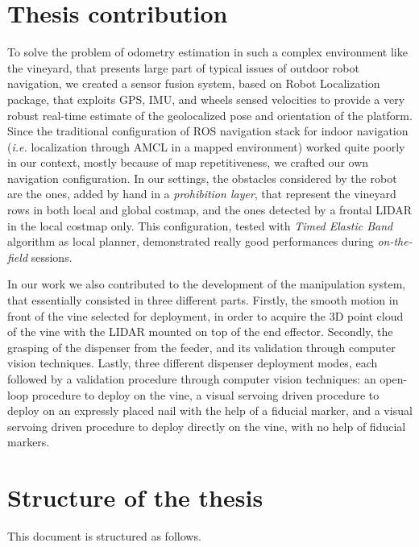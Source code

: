 \section{Thesis contribution}
To solve the problem of odometry estimation in such a complex environment like the vineyard, that presents large part of typical issues of outdoor robot navigation, we created a sensor fusion system, based on Robot Localization package, that exploits GPS, \ac{IMU}, and wheels sensed velocities to provide a very robust real-time estimate of the geolocalized pose and orientation of the platform. Since the traditional configuration of \ac{ROS} navigation stack for indoor navigation (\textit{i.e.} localization through \ac{AMCL} in a mapped environment) worked quite poorly in our context, mostly because of map repetitiveness, we crafted our own navigation configuration. In our settings, the obstacles considered by the robot are the ones, added by hand in a \textit{prohibition layer}, that represent the vineyard rows in both local and global costmap, and the ones detected by a frontal \ac{LIDAR} in the local costmap only. 
This configuration, tested with \textit{Timed Elastic Band} algorithm as local planner, demonstrated really good performances during \textit{on-the-field} sessions.
\par In our work we also contributed to the development of the manipulation system, that essentially consisted in three different parts. Firstly, the smooth motion in front of the vine selected for deployment, in order to acquire the 3D point cloud of the vine with the \ac{LIDAR} mounted on top of the end effector. Secondly, the grasping of the dispenser from the feeder, and its validation through computer vision techniques. Lastly, three different dispenser deployment modes, each followed by a validation procedure through computer vision techniques: an open-loop procedure to deploy on the vine, a visual servoing driven procedure to deploy on an expressly placed nail with the help of a fiducial marker, and a visual servoing driven procedure to deploy directly on the vine, with no help of fiducial markers.


\section{Structure of the thesis}
This document is structured as follows.

